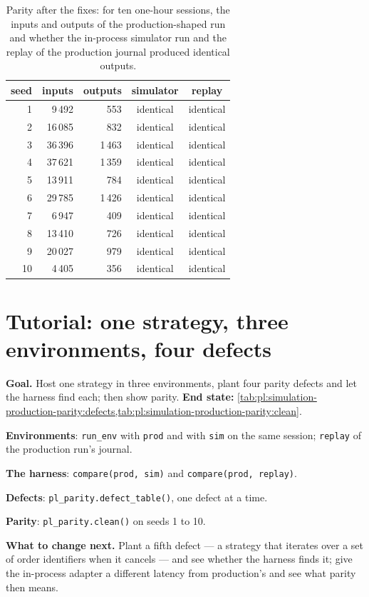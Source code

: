 \begin{table}[ht]
\centering\small
\begin{tabular}{rrrcc}
\toprule
seed & inputs & outputs & simulator & replay \\
\midrule
1 & 9\,492 & 553 & identical & identical \\
2 & 16\,085 & 832 & identical & identical \\
3 & 36\,396 & 1\,463 & identical & identical \\
4 & 37\,621 & 1\,359 & identical & identical \\
5 & 13\,911 & 784 & identical & identical \\
6 & 29\,785 & 1\,426 & identical & identical \\
7 & 6\,947 & 409 & identical & identical \\
8 & 13\,410 & 726 & identical & identical \\
9 & 20\,027 & 979 & identical & identical \\
10 & 4\,405 & 356 & identical & identical \\
\bottomrule
\end{tabular}
\caption{Parity after the fixes: for ten one-hour sessions, the inputs and outputs of the production-shaped run and whether the in-process
simulator run and the replay of the production journal produced identical outputs.}\label{tab:pl:simulation-production-parity:clean}
\end{table}

\section{Tutorial: one strategy, three environments, four defects}\label{tut:pl:simulation-production-parity:tut}

\begin{tutorial}
\textbf{Goal.} Host one strategy in three environments, plant four parity defects and let the harness find each; then show parity.
\textbf{End state:} \cref{tab:pl:simulation-production-parity:defects,tab:pl:simulation-production-parity:clean}.
\begin{tutsteps}
\item \textbf{Environments}: \texttt{run\_env} with \texttt{prod} and with \texttt{sim} on the same session; \texttt{replay} of the
production run's journal.
\item \textbf{The harness}: \texttt{compare(prod, sim)} and \texttt{compare(prod, replay)}.
\item \textbf{Defects}: \texttt{pl\_parity.defect\_table()}, one defect at a time.
\item \textbf{Parity}: \texttt{pl\_parity.clean()} on seeds 1 to 10.
\end{tutsteps}
\textbf{What to change next.} Plant a fifth defect --- a strategy that iterates over a set of order identifiers when it cancels --- and see
whether the harness finds it; give the in-process adapter a different latency from production's and see what parity then means.
\end{tutorial}


